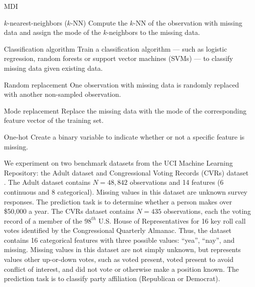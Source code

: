 \documentclass[10pt]{book}
\theoremstyle{definition}
\begin{document}
\begin{labeling}{MDI}

\item[$k$-nearest-neighbors ($k$-NN)]
Compute the $k$-NN of the observation with missing data and assign the mode of the $k$-neighbors to the missing data.

\item[Classification algorithm]
Train a classification algorithm --- such as logistic regression, random forests or support vector machines (SVMs) --- to classify missing data given existing data. 


\item[Random replacement] 
One observation with missing data is randomly replaced with another non-sampled observation.

\item[Mode replacement]
Replace the missing data with the mode of the corresponding feature vector of the training set.

\item[One-hot] Create a binary variable to indicate whether or not a specific feature is missing.

\end{labeling}

\par


\setcounter{chapter}{3}
\setcounter{equation}{0} %


We experiment on two benchmark datasets from the UCI Machine Learning Repository: the Adult dataset and Congressional Voting Records (CVRs) dataset \citep{Lichman2013}. The Adult dataset contains $N=48,842$ observations and 14 features (6 continuous and 8 categorical). Missing values in this dataset are unknown survey responses. The prediction task is to determine whether a person makes over \$50,000 a year. The CVRs dataset contains $N=435$ observations, each the voting record of a member of the $98^{th}$ U.S. House of Representatives for 16 key roll call votes identified by the Congressional Quarterly Almanac. Thus, the dataset contains 16 categorical features with three possible values: ``yea'', ``nay'', and missing. Missing values in this dataset are not simply unknown, but represents values other up-or-down votes, such as voted present, voted present to avoid conflict of interest, and did not vote or otherwise make a position known. The prediction task is to classify party affiliation (Republican or Democrat). 
\end{document}
